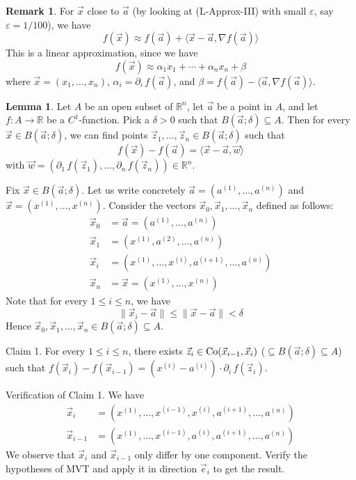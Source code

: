 \documentclass[11pt]{article}
\makeatletter
\theoremstyle{definition}
\newtheorem{lemma}[thm]{Lemma}
\newtheorem{remark}[thm]{Remark}
\newcommand{\R}{\ensuremath{\mathbb{R}}}
\newenvironment{pf}[1][\proofname]{\par
  \pushQED{\qed}%
  \normalfont \topsep0\p@\relax
  \trivlist
  \item[\hskip\labelsep\itshape
  #1\@addpunct{.}]\ignorespaces
}{%
  \popQED\endtrivlist\@endpefalse
}
\makeatother
\begin{document}
\begin{remark}
For $\vec{x}$ close to $\vec{a}$ (by looking at (L-Approx-III) with small $\varepsilon$, say $\varepsilon = 1/100$), we have
$$f(\vec{x}) \approx f(\vec{a}) + \langle \vec{x} - \vec{a}, \nabla  f(\vec{a}) \rangle$$
This is a linear approximation, since we have 
$$f(\vec{x}) \approx \alpha_1 x_1 + \cdots + \alpha_n x_n + \beta$$
where $\vec{x} = (x_1, \dots, x_n)$, $\alpha_i = \partial_i\,f(\vec{a})$, and $\beta = f(\vec{a}) - \langle \vec{a}, \nabla f(\vec{a}) \rangle$.
\end{remark}

\begin{lemma}
Let $A$ be an open subset of $\R^n$, let $\vec{a}$ be a point in $A$, and let $f : A \to \R$ be a $C^1$-function. Pick a $\delta > 0$ such that $B(\vec{a}; \delta) \subseteq A$. Then for every $\vec{x} \in B(\vec{a}; \delta)$, we can find points $\vec{z}_1, \dots, \vec{z}_n \in B(\vec{a}; \delta)$ such that
$$f(\vec{x}) - f(\vec{a}) = \langle \vec{x} - \vec{a}, \vec{w} \rangle$$
with $\vec{w} = (\partial_1\,f(\vec{z}_1), \dots, \partial_n\,f(\vec{z}_n)) \in \R^n$.
\begin{pf}
Fix $\vec{x} \in B(\vec{a}; \delta)$. Let us write concretely $\vec{a} = (a^{(1)}, \dots, a^{(n)})$ and $\vec{x} = (x^{(1)}, \dots, x^{(n)})$. Consider the vectors $\vec{x}_0, \vec{x}_1, \dots, \vec{x}_n$ defined as follows:
\begin{align*}
    \vec{x}_0 &= \vec{a} = (a^{(1)}, \dots, a^{(n)}) \\
    \vec{x}_1 &= (x^{(1)}, a^{(2)}, \dots, a^{(n)}) \\
    \vec{x}_i &= (x^{(1)}, \dots, x^{(i)}, a^{(i+1)}, \dots, a^{(n)}) \\
    \vec{x}_n &= \vec{x} = (x^{(1)}, \dots, x^{(n)})
\end{align*}
Note that for every $1 \leq i \leq n$, we have
$$\|\vec{x}_i - \vec{a}\| \leq \|\vec{x} - \vec{a}\| < \delta$$
Hence $\vec{x}_0, \vec{x}_1, \dots, \vec{x}_n \in B(\vec{a}; \delta) \subseteq A$.

{\sc Claim 1.} For every $1 \leq i \leq n$, there exists $\vec{z}_i \in {\rm Co}(\vec{x}_{i-1}, \vec{x}_i)$ ($\subseteq B(\vec{a}; \delta) \subseteq A$) such that $f(\vec{x}_i) - f(\vec{x}_{i-1}) = (x^{(i)} - a^{(i)}) \cdot \partial_i\,f(\vec{z}_i)$.

{\sc Verification of Claim 1.} We have
\begin{align*}
    \vec{x}_i &= (x^{(1)}, \dots, x^{(i-1)}, x^{(i)}, a^{(i+1)}, \dots, a^{(n)}) \\
    \vec{x}_{i-1} &= (x^{(1)}, \dots, x^{(i-1)}, a^{(i)}, a^{(i+1)}, \dots, a^{(n)}) 
\end{align*}
We observe that $\vec{x}_i$ and $\vec{x}_{i-1}$ only differ by one component. Verify the hypotheses of MVT and apply it in direction $\vec{e}_i$ to get the result.


\end{pf}
\end{lemma}
\end{document}
